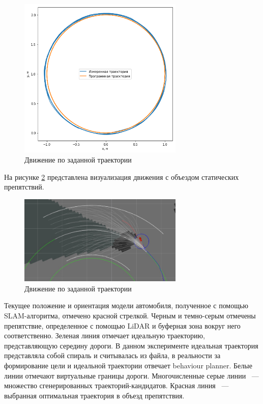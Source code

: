 \begin{figure}[h]
    \centering
    \includegraphics[width=0.7\textwidth]{images/path_moving_test}
    \caption{Движение по заданной траектории}
    \label{img:path_moving_test}
\end{figure}

На рисунке \ref{img:obstacle_avoidance} представлена визуализация движения с объездом статических
препятствий.

\begin{figure}[h]
    \centering
    \includegraphics[width=0.7\textwidth]{images/obstacle_avoidance}
    \caption{Движение по заданной траектории}
    \label{img:obstacle_avoidance}
\end{figure}

Текущее положение и ориентация модели автомобиля, полученное с помощью SLAM-алгоритма, отмечено 
красной стрелкой. Черным и темно-серым отмечены препятствие, определенное с помощью LiDAR и буферная
зона вокруг него соответственно. Зеленая линия отмечает идеальную траекторию, представляющую 
середину дороги. В данном эксперименте идеальная траектория представляла собой спираль и считывалась
из файла, в реальности за формирование цели и идеальной траектории отвечает behaviour planner. 
Белые линии отмечают виртуальные границы дороги. Многочисленные серые линии ~--- множество 
сгенерированных траекторий-кандидатов. Красная линия ~--- выбранная оптимальная траектория
в объезд препятствия.



